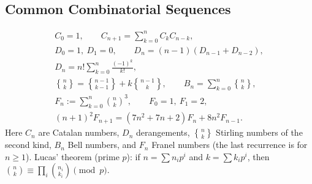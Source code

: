 \subsection*{Common Combinatorial Sequences}
\begin{gather*}
C_0=1,\qquad C_{n+1}=\sum_{k=0}^{n}C_kC_{n-k},\\
D_0=1,\ D_1=0,\qquad D_n=(n-1)(D_{n-1}+D_{n-2}),\\
D_n=n!\sum_{k=0}^{n}\frac{(-1)^k}{k!},\\
{n\brace k}={n-1\brace k-1}+k{n-1\brace k},\qquad
B_n=\sum_{k=0}^{n}{n\brace k},\\
F_n:=\sum_{k=0}^{n}\binom nk^3,\qquad F_0=1,\ F_1=2,\\
(n+1)^2F_{n+1}=(7n^2+7n+2)F_n+8n^2F_{n-1}.
\end{gather*}
Here $C_n$ are Catalan numbers, $D_n$ derangements, ${n\brace k}$
Stirling numbers of the second kind, $B_n$ Bell numbers, and $F_n$
Franel numbers (the last recurrence is for $n\ge1$).
Lucas' theorem (prime $p$): if $n=\sum n_ip^i$ and $k=\sum k_ip^i$,
then $\displaystyle\binom nk\equiv\prod_i\binom{n_i}{k_i}\pmod p$.
